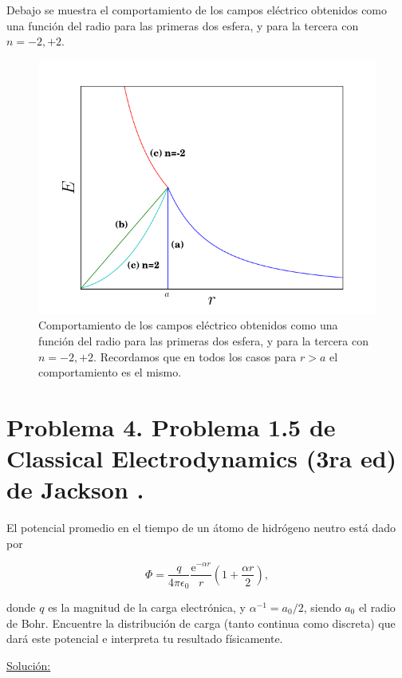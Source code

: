 \documentclass[a4paper,11pt]{article}
\numberwithin{equation}{section}
\newcommand{\euler}{\mathrm{e}}
\begin{document}
Debajo se muestra el comportamiento de los campos eléctrico obtenidos como 
una función del radio para las primeras dos esfera, y para la tercera 
con $n= -2,+2$. 

\begin{figure}[H]
 \center 
\includegraphics[scale=0.44]{problema3fig1}
 \caption{Comportamiento de los campos eléctrico obtenidos como 
una función del radio para las primeras dos esfera, y para la tercera 
con $n= -2,+2$. Recordamos que en todos los casos para $r>a$ el comportamiento 
es el mismo.}
 \label{fig:problema3fig1}
\end{figure}

\newpage

\section{Problema 4. Problema 1.5 de Classical Electrodynamics (3ra ed) de 
Jackson \cite{jackson}.}

El potencial promedio en el tiempo de un átomo de hidrógeno neutro está dado por 

$$
\Phi = \frac{q}{4\pi\epsilon_0}\frac{\euler^{-\alpha r}}{r}\left(1 + 
\frac{\alpha r}{2}\right),
$$

donde $q$ es la magnitud de la carga electrónica, y $\alpha^{-1} = a_0/2$, siendo 
$a_0$ el radio de Bohr. Encuentre la distribución de carga (tanto continua como 
discreta) que dará este potencial e interpreta tu resultado físicamente.

\vspace{.3cm}

\underline{Solución:} \vspace{.3cm}
\end{document}
